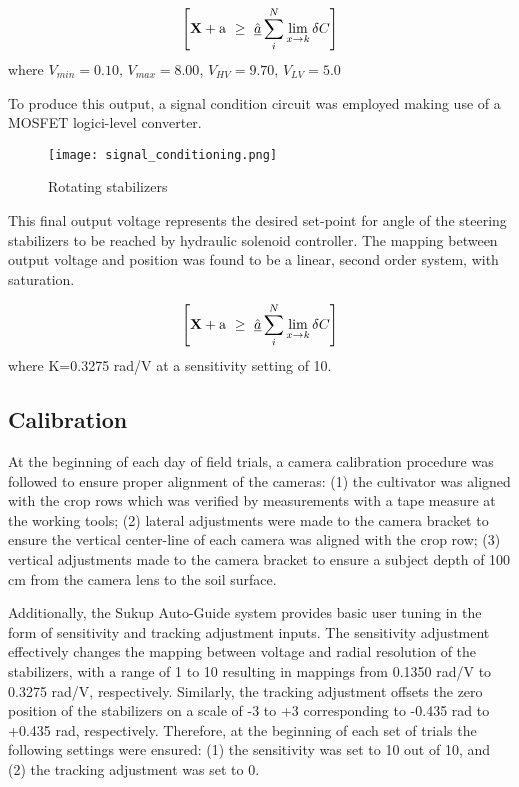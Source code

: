 \begin{flushleft}
\begin{flushleft}
\begin{equation}
  \left[
    {\bf X} + {\rm a} \ \geq\ 
    \underline{\hat a} \sum_i^N \lim_{x \rightarrow k} \delta C
  \right]
  \label{eq:v_out}
\end{equation}
where $V_{min}=0.10$, $V_{max}=8.00$, $V_{HV}=9.70$, $V_{LV}=5.0$

To produce this output, a signal condition circuit was employed making
use of a MOSFET logici-level converter.

\begin{figure}
  \centering
  \texttt{[image: signal\_conditioning.png]}
  \caption{Rotating stabilizers}
  \label{fig:signal_conditioning}
\end{figure}

This final output voltage represents the desired set-point for angle
of the steering stabilizers to be reached by hydraulic solenoid
controller. The mapping between output voltage and position was found
to be a linear, second order system, with saturation.

\begin{equation}
  \left[
    {\bf X} + {\rm a} \ \geq\ 
    \underline{\hat a} \sum_i^N \lim_{x \rightarrow k} \delta C
  \right]
  \label{eq:v_out}
\end{equation}
where K=0.3275 rad/V at a sensitivity setting of 10.

\subsection{Calibration}
At the beginning of each day of field trials, a camera calibration
procedure was followed to ensure proper alignment of the cameras: (1)
the cultivator was aligned with the crop rows which was verified by
measurements with a tape measure at the working tools; (2) lateral
adjustments were made to the camera bracket to ensure the vertical
center-line of each camera was aligned with the crop row; (3) vertical
adjustments made to the camera bracket to ensure a subject depth of
100 cm from the camera lens to the soil surface.

Additionally, the Sukup Auto-Guide system provides basic user tuning
in the form of sensitivity and tracking adjustment inputs. The
sensitivity adjustment effectively changes the mapping between voltage
and radial resolution of the stabilizers, with a range of 1 to 10
resulting in mappings from 0.1350 rad/V to 0.3275 rad/V,
respectively. Similarly, the tracking adjustment offsets the zero
position of the stabilizers on a scale of -3 to +3 corresponding to
-0.435 rad to +0.435 rad, respectively. Therefore, at the beginning of
each set of trials the following settings were ensured: (1) the
sensitivity was set to 10 out of 10, and (2) the tracking adjustment
was set to 0.


\end{flushleft}
\end{flushleft}

